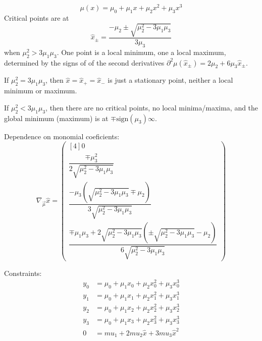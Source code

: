 % 

% 


\begin{equation}
\mu(x) = \mu_0 + \mu_1 x + \mu_2 x^2 + \mu_3 x^3
\end{equation}
Critical points are at
\begin{equation}
\hat{x}_{\pm} = \frac{-\mu_2 \pm \sqrt{ \mu_2^{2} - 3 \mu_1 \mu_3 }}{3 \mu_3}
\end{equation}
when $\mu_2^{2} > 3 \mu_1 \mu_3$.
One point is a local minimum, one a local maximum, 
determined by the signs of of the second derivatives
$\partial^2\mu(\hat{x}_{\pm}) = 2 \mu_2 + 6 \mu_3 \hat{x}_{\pm}$.

If $\mu_2^{2} = 3 \mu_1 \mu_3$, 
then $\hat{x} = \hat{x}_{+} = \hat{x}_{-}$ is just a stationary
point, neither a local minimum or maximum.

If $\mu_2^{2} < 3 \mu_1 \mu_3$, then there are no critical points,
no local minima/maxima, and the global minimum (maximum) is at
$\mp\text{sign}(\mu_3)\infty$.

Dependence on monomial coeficients:
\begin{equation}
\nabla_{\vec{\mu}} \hat{x} =
\begin{pmatrix}[4]
0 
\\
\dfrac{
\mp \mu_3^{2}
}{
2 \sqrt{\mu_2^{2} -3 \mu_1 \mu_3}
}
\\
\dfrac{
-\mu_3 \left(\sqrt{\mu_2^{2} -3 \mu_1 \mu_3} \mp \mu_2\right)
}{
3 \sqrt{\mu_2^{2} -3 \mu_1 \mu_3}
}
\\
\dfrac{
\mp \mu_1 \mu_3
+ 2 \sqrt{\mu_2^{2} - 3 \mu_1 \mu_3}
\left(\pm \sqrt{\mu_2^{2} - 3 \mu_1 \mu_3}  - \mu_2 \right)
}{
6 \sqrt{\mu_2^{2} -3 \mu_1 \mu_3}
}
\end{pmatrix}
\end{equation}

\label{sec:monomial-yyyy}

Constraints:
\begin{align}
y_0 & = \mu_0 + \mu_1 x_0 + \mu_2 x_0^2 + \mu_3 x_0^3
\\
y_1 & = \mu_0 + \mu_1 x_1 + \mu_2 x_1^2 + \mu_3 x_1^3
\nonumber
\\
y_2 & = \mu_0 + \mu_1 x_2 + \mu_2 x_2^2 + \mu_3 x_2^3
\\
y_3 & = \mu_0 + \mu_1 x_3 + \mu_2 x_3^2 + \mu_3 x_3^3
\nonumber
\\
0 & =  mu_1 + 2 mu_2 \hat{x} + 3 mu_3 \hat{x}^2
\nonumber
\end{align}

